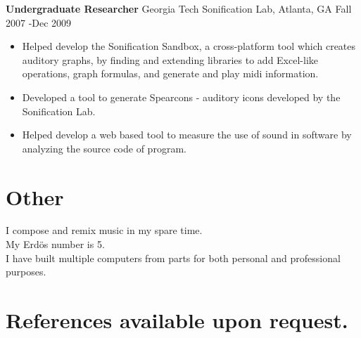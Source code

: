 \documentclass{res}
\begin{document}
\begin{resume}
{\bf Undergraduate Researcher} Georgia Tech Sonification Lab, Atlanta, GA Fall 2007 -Dec 2009
	\begin{itemize}
		\item Helped develop the Sonification Sandbox, a cross-platform tool which creates auditory graphs, by finding and extending libraries to add Excel-like operations, graph formulas, and generate and play midi information.
		\item Developed a tool to generate Spearcons - auditory icons developed by the Sonification Lab.
		\item Helped develop a web based tool to measure the use of sound in software by analyzing the source code of program.
    \end{itemize}      
    



\section{Other}
I compose and remix music in my spare time. \\
My Erd\"{o}s number is 5.\\
I have built multiple computers from parts for both personal and professional purposes.



\end{resume} 
\section{References available upon request.}
\end{document}
